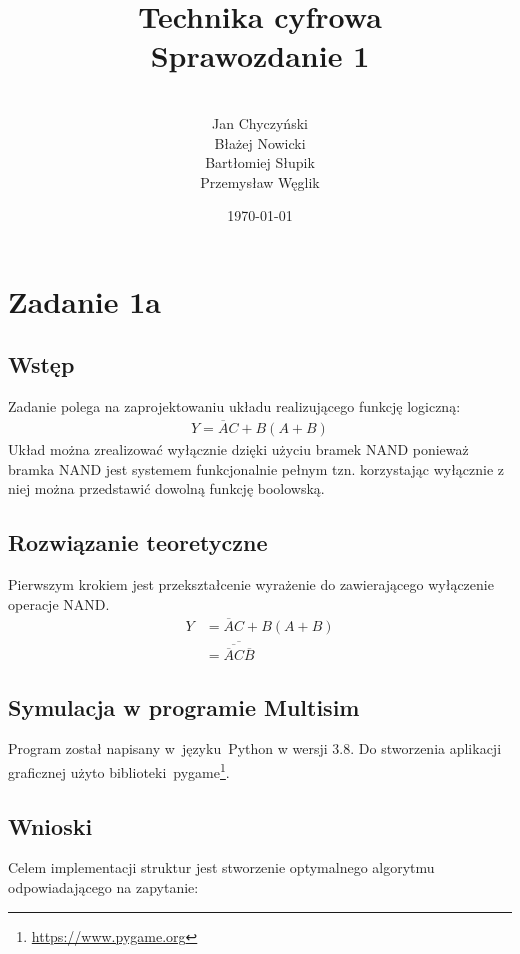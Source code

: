 \documentclass[12pt,a4paper,openright]{mwrep}
\begin{document}
\title{%
Technika cyfrowa\\
Sprawozdanie 1\\
}

\author{\\Jan Chyczyński\\Błażej Nowicki
\\Bartłomiej Słupik\\Przemysław Węglik}

\date{\today}

\maketitle

\chapter{Zadanie 1a}

\section{Wstęp}
Zadanie polega na zaprojektowaniu układu realizującego 
funkcję logiczną:
\begin{align*}
    Y = \overline{A}C + B(A + B)
\end{align*}
Układ można zrealizować wyłącznie dzięki użyciu bramek NAND
ponieważ bramka NAND jest systemem funkcjonalnie pełnym tzn.
korzystając wyłącznie z niej można przedstawić dowolną funkcję
boolowską.



\section{Rozwiązanie teoretyczne}
Pierwszym krokiem jest przekształcenie wyrażenie do zawierającego
wyłączenie operacje NAND.
\begin{align*}
    Y &= \overline{A}C + B(A + B) \\
    &= \overline{\overline{\overline{A}C}\overline{B}}
\end{align*}

\section{Symulacja w programie Multisim}
Program został napisany w~języku~Python w wersji 3.8.
Do stworzenia aplikacji graficznej użyto
biblioteki~pygame\footnote{\url{https://www.pygame.org}}.

\section{Wnioski}
Celem implementacji struktur jest
stworzenie optymalnego
algorytmu odpowiadającego na zapytanie:
\end{document}
